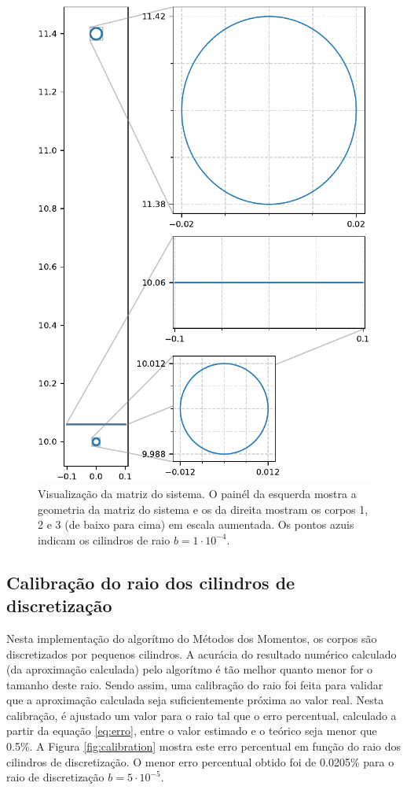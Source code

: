 \documentclass{aleph-revista}
\begin{document}
\begin{figure}[!h]
  \centering
  \includegraphics[width=\textwidth]{figures/matrix_plot.pdf}
  \caption{Visualização da matriz do sistema. O painél da esquerda mostra a geometria da matriz do sistema e os da direita mostram os corpos 1, 2 e 3 (de baixo para cima) em escala aumentada. Os pontos azuis indicam os cilindros de raio $b=1\cdot 10^{-4}$.}
  \label{fig:matrix}
\end{figure}

\newpage


\subsection{Calibração do raio dos cilindros de discretização}
Nesta implementação do algorítmo do Métodos dos Momentos, os corpos são discretizados por pequenos cilindros. A acurácia do resultado numérico calculado (da aproximação calculada) pelo algorítmo é tão melhor quanto menor for o tamanho deste raio. Sendo assim, uma calibração do raio foi feita para validar que a aproximação calculada seja suficientemente próxima ao valor real. Nesta calibração, é ajustado um valor para o raio tal que o erro percentual, calculado a partir da equação \eqref{eq:erro}, entre o valor estimado e o teórico seja menor que 0.5\%. A Figura \ref{fig:calibration} mostra este erro percentual em função do raio dos cilindros de discretização. O menor erro percentual obtido foi de 0.0205\% para o raio de discretização $b=5\cdot 10^{-5}$.
\end{document}
